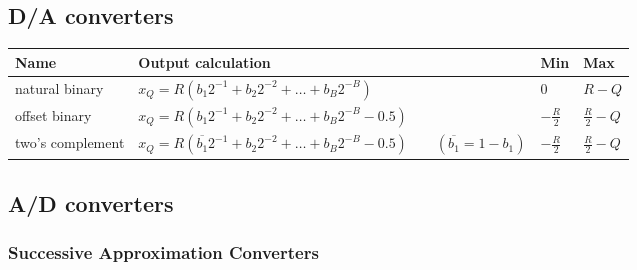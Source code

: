 \subsection{D/A converters}
\begin{tabularx}{\textwidth}{|l|X|l|l|}
	\hline
	\textbf{Name} & \textbf{Output calculation} & \textbf{Min} & \textbf{Max}
	\\ \hline
	natural binary
	& $x_Q = R(b_1 2^{-1} + b_2 2^{-2} + \ldots + b_B 2^{-B})$ 
	& $0$
	& $R-Q$
	\\ \hline
	offset binary
	& $x_Q = R(b_1 2^{-1} + b_2 2^{-2} + \ldots + b_B 2^{-B} - 0.5)$ 
	& $-\frac{R}{2}$ 
	& $\frac{R}{2} - Q$ 
	\\ \hline
	two's complement
	& $x_Q = R(\overline{b_1} 2^{-1} + b_2 2^{-2} + \ldots + b_B 2^{-B} - 0.5) \qquad (\overline{b_1}=1-b_1)$
	& $-\frac{R}{2}$ 
	& $\frac{R}{2} - Q$ 
	\\ \hline
\end{tabularx}


\subsection{A/D converters}

\subsubsection{Successive Approximation Converters}

